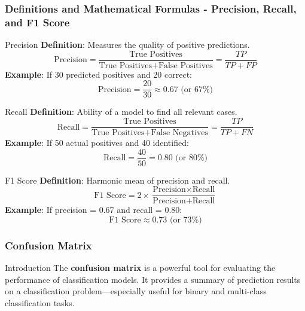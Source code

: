 \documentclass[aspectratio=169]{beamer}
\begin{document}
\begin{frame}[fragile]
    \frametitle{Definitions and Mathematical Formulas - Precision, Recall, and F1 Score}
    \begin{block}{Precision}
        \textbf{Definition}: Measures the quality of positive predictions.
        \begin{equation}
            \text{Precision} = \frac{\text{True Positives}}{\text{True Positives} + \text{False Positives}} = \frac{TP}{TP + FP}
        \end{equation}
        \textbf{Example}: If 30 predicted positives and 20 correct:
        \begin{equation}
            \text{Precision} = \frac{20}{30} \approx 0.67 \text{ (or 67\%)}
        \end{equation}
    \end{block}
    
    \begin{block}{Recall}
        \textbf{Definition}: Ability of a model to find all relevant cases.
        \begin{equation}
            \text{Recall} = \frac{\text{True Positives}}{\text{True Positives} + \text{False Negatives}} = \frac{TP}{TP + FN}
        \end{equation}
        \textbf{Example}: If 50 actual positives and 40 identified:
        \begin{equation}
            \text{Recall} = \frac{40}{50} = 0.80 \text{ (or 80\%)}
        \end{equation}
    \end{block}
    
    \begin{block}{F1 Score}
        \textbf{Definition}: Harmonic mean of precision and recall.
        \begin{equation}
            \text{F1 Score} = 2 \times \frac{\text{Precision} \times \text{Recall}}{\text{Precision} + \text{Recall}}
        \end{equation}
        \textbf{Example}: If precision = 0.67 and recall = 0.80:
        \begin{equation}
            \text{F1 Score} \approx 0.73 \text{ (or 73\%)}
        \end{equation}
    \end{block}
\end{frame}

\begin{frame}[fragile]
  \frametitle{Confusion Matrix}
  \begin{block}{Introduction}
    The \textbf{confusion matrix} is a powerful tool for evaluating the performance of classification models. 
    It provides a summary of prediction results on a classification problem—especially useful for binary and multi-class classification tasks.
  \end{block}
\end{frame}
\end{document}
